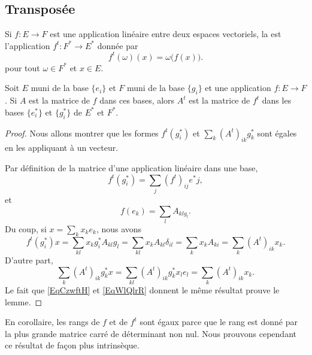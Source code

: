 \subsection{Transposée}

\begin{definition}      \label{DefooZLPAooKTITdd}
    Si \( f\colon E\to F\) est une application linéaire entre deux espaces vectoriels, la  est l'application \( f^t\colon F^*\to E^*\) donnée par
    \begin{equation}
        f^t(\omega)(x)=\omega\big( f(x) \big).
    \end{equation}
    pour tout \( \omega\in F^*\) et \( x\in E\).
\end{definition}

\begin{lemma}
    Soit \( E\) muni de la base \( \{ e_i \}\) et \( F\) muni de la base \( \{ g_i \}\) et une application \( f\colon E\to F\). Si \( A\) est la matrice de \( f\) dans ces bases, alors \( A^t\) est la matrice de \( f^t\) dans les bases \( \{ e^*_i \}\) et \( \{ g^*_i \}\) de \( E^*\) et \( F^*\).
\end{lemma}

\begin{proof}
    Nous allons montrer que les formes \( f^t(g^*_i)\) et \( \sum_k(A^t)_{ik}g^*_k\) sont égales en les appliquant à un vecteur.

    Par définition de la matrice d'une application linéaire dans une base,
    \begin{equation}
        f^t(g_i^*)=\sum_j(f^t)_{ij}e^*j,
    \end{equation}
    et
    \begin{equation}
        f(e_k)=\sum_lA_{klg_l}.
    \end{equation}
    Du coup, si \( x=\sum_kx_ke_k\), nous avons
    \begin{equation}    \label{EqCzwftH}
        f^t(g_i^*)x=\sum_{kl}x_kg_i^*A_{kl}g_l=\sum_{kl}x_kA_{kl}\delta_{il}=\sum_k x_kA_{ki}=\sum_k(A^t)_{ik}x_k.
    \end{equation}
    D'autre part, 
    \begin{equation}    \label{EqWlQlrR}
        \sum_k(A^t)_{ik}g_k^*x=\sum_{kl}(A^t)_{ik}g^*_kx_le_l=\sum_k(A^t)_{ik}x_k.
    \end{equation}
    Le fait que \eqref{EqCzwftH} et \eqref{EqWlQlrR} donnent le même résultat prouve le lemme.
\end{proof}
En corollaire, les rangs de \( f\) et de \( f^t\) sont égaux parce que le rang est donné par la plus grande matrice carré de déterminant non nul. Nous prouvons cependant ce résultat de façon plus intrinsèque.

